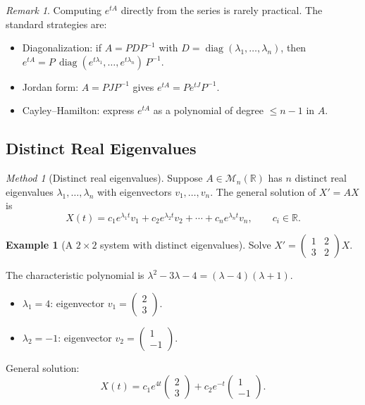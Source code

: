 \documentclass[12pt,a4paper,openany]{book}
\theoremstyle{definition}
\newtheorem{example}[definition]{Example}
\theoremstyle{plain}
\theoremstyle{remark}
\newtheorem{remark}[definition]{Remark}
\newtheorem{method}[definition]{Method}
\newcommand{\R}{\mathbb{R}}
\DeclareMathOperator{\diag}{diag}
\begin{document}
\begin{remark}\label{rem:computing-exp}
Computing $e^{tA}$ directly from the series is rarely practical.
The standard strategies are:
\begin{itemize}
  \item Diagonalization: if $A=PDP^{-1}$ with
    $D=\diag(\lambda_1,\dots,\lambda_n)$, then
    $e^{tA}=P\,\diag(e^{t\lambda_1},\dots,e^{t\lambda_n})\,P^{-1}$.
  \item Jordan form: $A=PJP^{-1}$ gives $e^{tA}=Pe^{tJ}P^{-1}$.
  \item Cayley--Hamilton: express $e^{tA}$ as a polynomial of degree
    $\le n-1$ in $A$.
\end{itemize}
\end{remark}

\subsection{Distinct Real Eigenvalues}\label{subsec:distinct-real}

\begin{method}[Distinct real eigenvalues]\label{meth:distinct-real}
Suppose $A\in\mathcal{M}_n(\R)$ has $n$ distinct real eigenvalues
$\lambda_1,\dots,\lambda_n$ with eigenvectors $v_1,\dots,v_n$.
The general solution of $X'=AX$ is
\begin{equation}\label{eq:sol-distinct-real}
  X(t) = c_1 e^{\lambda_1 t}v_1 + c_2 e^{\lambda_2 t}v_2
         + \cdots + c_n e^{\lambda_n t}v_n,
  \qquad c_i\in\R.
\end{equation}
\end{method}

\begin{example}[A $2\times 2$ system with distinct eigenvalues]\label{ex:2x2-distinct}
Solve $X' = \begin{pmatrix} 1 & 2 \\ 3 & 2 \end{pmatrix}X$.

The characteristic polynomial is $\lambda^2 - 3\lambda - 4 = (\lambda-4)(\lambda+1)$.
\begin{itemize}
  \item $\lambda_1 = 4$: eigenvector $v_1 = \begin{pmatrix}2\\3\end{pmatrix}$.
  \item $\lambda_2 = -1$: eigenvector $v_2 = \begin{pmatrix}1\\-1\end{pmatrix}$.
\end{itemize}
General solution:
\[
  X(t) = c_1 e^{4t}\begin{pmatrix}2\\3\end{pmatrix}
        + c_2 e^{-t}\begin{pmatrix}1\\-1\end{pmatrix}.
\]
\end{example}
\end{document}
